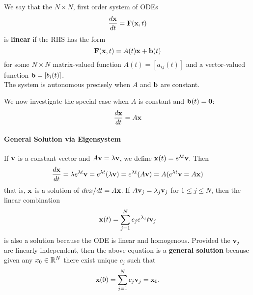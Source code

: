 We say that the \(N \times N\), first order system of ODEs
\[\frac{d \mathbf{x}}{dt} = \mathbf{F}(\mathbf{x}, t)\]
is \textbf{linear} if the RHS has the form
\[\mathbf{F}(\mathbf{x}, t) = A(t) \mathbf{x} + \mathbf{b} (t)\]
for some \(N \times N\) matrix-valued function \(A(t) = [a_{ij}(t)]\) and a vector-valued function \(\mathbf{b} = [b_i(t)]\). \\

The system is autonomous precisely when \(A\) and \(\mathbf{b}\) are constant.


\bigskip
We now investigate the special case when \(A\) is constant and \(\mathbf{b}(t) = \mathbf{0}\):
\[\frac{d \mathbf{x}}{dt} = A\mathbf{x}\]

\paragraph{General Solution via Eigensystem}
If \(\mathbf{v}\) is a constant vector and \(A\mathbf{v} = \lambda \mathbf{v}\), we define \(\mathbf{x}(t) = e^{\lambda t}\mathbf{v}\). Then
\[\frac{d \mathbf{x}}{dt} = \lambda e^{\lambda t}\mathbf{v} = e^{\lambda t}(\lambda \mathbf{v}) = e^{\lambda t}(A \mathbf{v}) = A(e^{\lambda t}\mathbf{v} = A\mathbf{x})\]
that is, \(\mathbf{x}\) is a solution of \(d vx / dt = A\mathbf{x}\).
If \(A\mathbf{v}_j = \lambda_j \mathbf{v}_j\) for \(1 \leq j \leq N\), then the linear combination
\[\mathbf{x}(t) = \sum_{j=1}^N c_j e^{\lambda_j}t \mathbf{v}_j\]
is also a solution because the ODE is linear and homogenous. Provided the \(\mathbf{v}_j\) are linearly independent, then the above equation is a \textbf{general solution} because given any \(x_0 \in \mathbb{R}^N\) there exist unique \(c_j\) such that
\[\mathbf{x}(0) = \sum_{j=1}^N c_j \mathbf{v}_j = \mathbf{x}_0.\]

